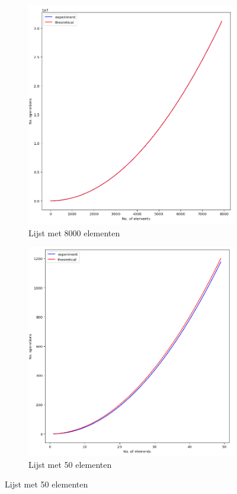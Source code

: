 \documentclass[]{article}
\begin{document}
\begin{figure}[h!]
	\centering
	\begin{subfigure}[b]{.44\textwidth}
		\centering
		\includegraphics[width=\textwidth]{big}
		\caption{Lijst met 8000 elementen}
	\end{subfigure}
	\hfill
	\begin{subfigure}[b]{.45\textwidth}
		\centering
		\includegraphics[width=\textwidth]{small}
		\caption{Lijst met 50 elementen}
	\end{subfigure}
\end{figure}
\end{document}
